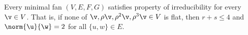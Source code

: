 
%
%
%



\begin{lemma}
Every minimal fan $(V,E,F,G)$ satisfies property 
of irreducibility for every $\v\in V$.  That is, if none of $\v,\rho
\v,\rho^2 \v,\rho^3 \v\in V$ is flat, then $r+s\le 4$ and
$\norm{\u}{\w}=2$ for all $\{u,w\}\in E$.
\end{lemma}

